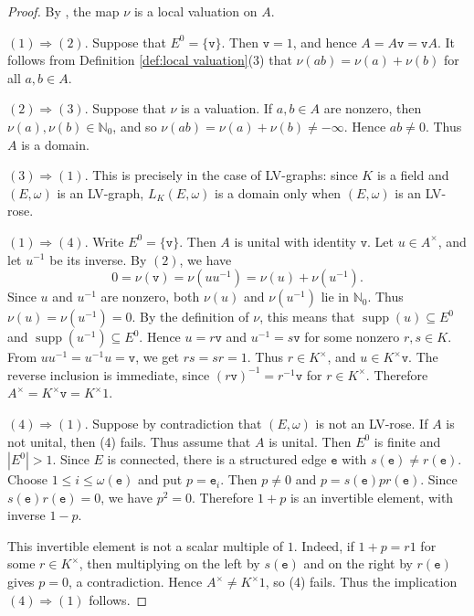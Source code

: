 \documentclass{article}
\theoremstyle{definition}
\begin{document}
\begin{proof}
By \cite[Proposition 40]{HaP}, the map $\nu$ is a local valuation
on $A$.

$(1)\Rightarrow(2)$. Suppose that $E^0=\{\mathtt{v}\}$. Then $\mathtt{v}=1$, and hence $A=A\mathtt{v}=\mathtt{v}A$. It follows from Definition \ref{def:local valuation}(3) that $\nu(ab)=\nu(a)+\nu(b)$ for all $a,b\in A$.

$(2)\Rightarrow(3)$. Suppose that $\nu$ is a valuation. If $a,b\in A$ are
nonzero, then $\nu(a),\nu(b)\in\mathbb N_0$, and so
$\nu(ab)=\nu(a)+\nu(b)\neq -\infty$. Hence $ab\neq 0$. Thus $A$ is a domain.

$(3)\Rightarrow(1)$. This is precisely \cite[Theorem 41]{HaP} in
the case of LV-graphs: since $K$ is a field and $(E,\omega)$ is an LV-graph,
$L_K(E,\omega)$ is a domain only when $(E,\omega)$ is an LV-rose.

$(1)\Rightarrow(4)$. Write $E^0=\{\mathtt{v}\}$. Then $A$ is unital with identity $\mathtt{v}$.
Let $u\in A^\times$, and let $u^{-1}$ be its inverse. By $(2)$, we have
$$
0=\nu(\mathtt{v})=\nu(uu^{-1})=\nu(u)+\nu(u^{-1}).
$$
Since $u$ and $u^{-1}$ are nonzero, both $\nu(u)$ and $\nu(u^{-1})$ lie in
$\mathbb N_0$. Thus $\nu(u)=\nu(u^{-1})=0$. By the definition of $\nu$, this
means that $\operatorname{supp}(u)\subseteq E^0$ and
$\operatorname{supp}(u^{-1})\subseteq E^0$. Hence $u=r\mathtt{v}$ and $u^{-1}=s\mathtt{v}$ for
some nonzero $r,s\in K$. From $uu^{-1}=u^{-1}u=\mathtt{v}$, we get $rs=sr=1$. Thus
$r\in K^\times$, and $u\in K^\times \mathtt{v}$. The reverse inclusion is immediate, since
$(r\mathtt{v})^{-1}=r^{-1}\mathtt{v}$ for $r\in K^\times$. Therefore
$A^\times=K^\times \mathtt{v}=K^\times 1$.

$(4)\Rightarrow(1)$. Suppose by contradiction that $(E,\omega)$ is
not an LV-rose. If $A$ is not unital, then (4) fails. Thus assume that $A$ is
unital. Then $E^0$ is finite and $|E^0|>1$. Since $E$ is connected, there is a
structured edge $\mathtt{e}$ with $s(\mathtt{e})\neq r(\mathtt{e})$. Choose
$1\leq i\leq \omega(\mathtt{e})$ and put $p=\mathtt{e}_i$. Then $p\neq 0$ and
$p=s(\mathtt{e})p r(\mathtt{e})$. Since $s(\mathtt{e})r(\mathtt{e})=0$, we have $p^2=0$.
Therefore $1+p$ is an invertible element, with inverse $1-p$.

This invertible element is not a scalar multiple of $1$. Indeed, if $1+p=r1$ for some
$r\in K^\times$, then multiplying on the left by $s(\mathtt{e})$ and on the right by
$r(\mathtt{e})$ gives $p=0$, a contradiction. Hence
$A^\times\neq K^\times 1$, so (4) fails. Thus the implication $(4)\Rightarrow(1)$ follows.
\end{proof}
\end{document}

